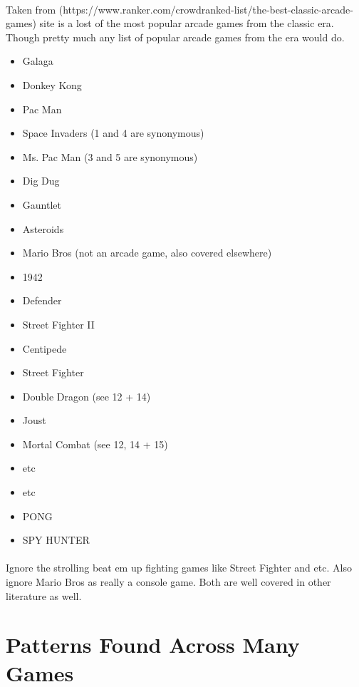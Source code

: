 \documentclass{article}
\begin{document}
\paragraph{} Taken from (https://www.ranker.com/crowdranked-list/the-best-classic-arcade-games)
 site is a lost of the most popular arcade games from the classic era.
Though pretty much any list of popular arcade games from the era would do.

\begin{itemize}

    \item Galaga
    \item Donkey Kong
    \item Pac Man
    \item Space Invaders (1 and 4 are synonymous)
    \item Ms. Pac Man (3 and 5 are synonymous)
    \item Dig Dug
    \item Gauntlet
    \item Asteroids
    \item Mario Bros (not an arcade game, also covered elsewhere)
    \item 1942
    \item Defender
    \item Street Fighter II 
    \item Centipede
    \item Street Fighter
    \item Double Dragon (see 12 + 14)
    \item Joust
    \item Mortal Combat (see 12, 14 + 15)
    \item etc
    \item etc
    \item PONG
    \item SPY HUNTER

\end{itemize}

\paragraph{} Ignore the strolling beat em up fighting games like Street Fighter and etc. Also
ignore Mario Bros as really a console game. Both are well covered in other literature as well.

\section{Patterns Found Across Many Games}
\end{document}

